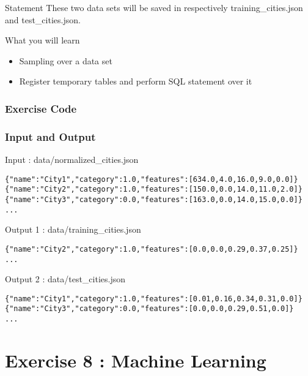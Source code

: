 \documentclass[slidetop,9pt,utf8]{beamer}
\begin{document}
\begin{CJK}{UTF8}{gbsn}
\begin{frame}
\begin{block}{Statement}
    These two data sets will be saved in respectively training\_cities.json and test\_cities.json.
  \end{block}

  \begin{block}{What you will learn}
    \begin{itemize}
      \item Sampling over a data set
      \item Register temporary tables and perform SQL statement over it
    \end{itemize}
  \end{block}

\end{frame}

\begin{frame}
  \frametitle{Exercise Code}

  

\end{frame}

\begin{frame}[fragile]

  \frametitle{Input and Output}
  
  \begin{block}{Input : data/normalized\_cities.json}
    \begin{verbatim}
{"name":"City1","category":1.0,"features":[634.0,4.0,16.0,9.0,0.0]}
{"name":"City2","category":1.0,"features":[150.0,0.0,14.0,11.0,2.0]}
{"name":"City3","category":0.0,"features":[163.0,0.0,14.0,15.0,0.0]}
...
    \end{verbatim}
  \end{block}

  \begin{block}{Output 1 : data/training\_cities.json}
    \begin{verbatim}
{"name":"City2","category":1.0,"features":[0.0,0.0,0.29,0.37,0.25]}
...
    \end{verbatim}
  \end{block}

  \begin{block}{Output 2 : data/test\_cities.json}
    \begin{verbatim}
{"name":"City1","category":1.0,"features":[0.01,0.16,0.34,0.31,0.0]}
{"name":"City3","category":0.0,"features":[0.0,0.0,0.29,0.51,0.0]}
...
    \end{verbatim}
  \end{block}

\end{frame}

\section{Exercise 8 : Machine Learning}


\end{CJK}
\end{document}

